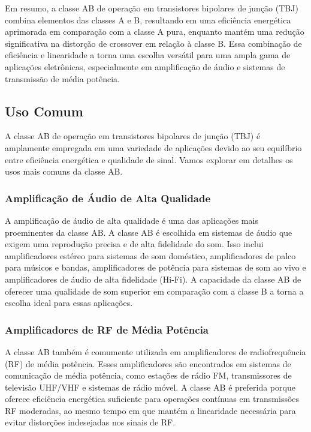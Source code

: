 Em resumo, a classe AB de operação em transistores bipolares de junção (TBJ) combina elementos das classes A e B, resultando em uma eficiência energética aprimorada em comparação com a classe A pura, enquanto mantém uma redução significativa na distorção de crossover em relação à classe B. Essa combinação de eficiência e linearidade a torna uma escolha versátil para uma ampla gama de aplicações eletrônicas, especialmente em amplificação de áudio e sistemas de transmissão de média potência.

\subsection{Uso Comum}

A classe AB de operação em transistores bipolares de junção (TBJ) é amplamente empregada em uma variedade de aplicações devido ao seu equilíbrio entre eficiência energética e qualidade de sinal. Vamos explorar em detalhes os usos mais comuns da classe AB.

\subsubsection{Amplificação de Áudio de Alta Qualidade}

A amplificação de áudio de alta qualidade é uma das aplicações mais proeminentes da classe AB. A classe AB é escolhida em sistemas de áudio que exigem uma reprodução precisa e de alta fidelidade do som. Isso inclui amplificadores estéreo para sistemas de som doméstico, amplificadores de palco para músicos e bandas, amplificadores de potência para sistemas de som ao vivo e amplificadores de áudio de alta fidelidade (Hi-Fi). A capacidade da classe AB de oferecer uma qualidade de som superior em comparação com a classe B a torna a escolha ideal para essas aplicações.

\subsubsection{Amplificadores de RF de Média Potência}

A classe AB também é comumente utilizada em amplificadores de radiofrequência (RF) de média potência. Esses amplificadores são encontrados em sistemas de comunicação de média potência, como estações de rádio FM, transmissores de televisão UHF/VHF e sistemas de rádio móvel. A classe AB é preferida porque oferece eficiência energética suficiente para operações contínuas em transmissões RF moderadas, ao mesmo tempo em que mantém a linearidade necessária para evitar distorções indesejadas nos sinais de RF.

